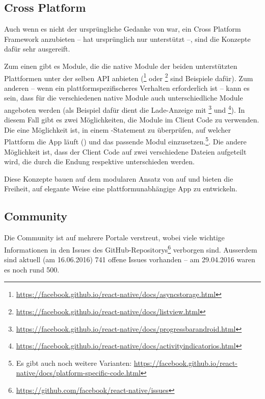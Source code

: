 \subsection{Cross Platform}
Auch wenn es nicht der ursprüngliche Gedanke von  war, ein Cross Platform Framework anzubieten --  hat ursprünglich nur  unterstützt --, sind die Konzepte dafür sehr ausgereift.

Zum einen gibt es  Module, die die native Module der beiden unterstützten Plattformen unter der selben API anbieten (\footnote{\url{https://facebook.github.io/react-native/docs/asyncstorage.html}} oder \footnote{\url{https://facebook.github.io/react-native/docs/listview.html}} sind Beispiele dafür).\newline
Zum anderen -- wenn ein plattformspezifischeres Verhalten erforderlich ist -- kann es sein, dass für die verschiedenen native Module auch unterschiedliche  Module angeboten werden (als Beispiel dafür dient die Lade-Anzeige mit \footnote{\url{https://facebook.github.io/react-native/docs/progressbarandroid.html}} und \footnote{\url{https://facebook.github.io/react-native/docs/activityindicatorios.html}}).
In diesem Fall gibt es zwei Möglichkeiten, die Module im Client Code zu verwenden.
Die eine Möglichkeit ist, in einem -Statement zu überprüfen, auf welcher Plattform die App läuft () und das passende Modul einzusetzen.\footnote{Es gibt auch noch weitere Varianten: \url{https://facebook.github.io/react-native/docs/platform-specific-code.html}}.
Die andere Möglichkeit ist, dass der Client Code auf zwei verschiedene Dateien aufgeteilt wird, die durch die Endung  respektive  unterschieden werden.

Diese Konzepte bauen auf dem modularen Ansatz von  auf und bieten die Freiheit, auf elegante Weise eine plattformunabhängige App zu entwickeln.

\subsection{Community}
Die Community ist auf mehrere Portale verstreut, wobei viele wichtige Informationen in den Issues des  GitHub-Repositorys\footnote{\url{https://github.com/facebook/react-native/issues}} verborgen sind.
Ausserdem sind aktuell (am 16.06.2016) 741 offene Issues vorhanden -- am 29.04.2016 waren es noch rund 500.

